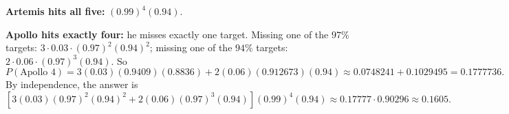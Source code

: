 \textbf{Artemis hits all five:} $(0.99)^4(0.94)$.

\textbf{Apollo hits exactly four:} he misses exactly one target. Missing one of the $97\%$ targets: $3\cdot0.03\cdot(0.97)^2(0.94)^2$; missing one of the $94\%$ targets: $2\cdot0.06\cdot(0.97)^3(0.94)$. So
\[P(\text{Apollo }4)=3(0.03)(0.9409)(0.8836)+2(0.06)(0.912673)(0.94)\approx0.0748241+0.1029495=0.1777736.\]
By independence, the answer is
\[\left[3(0.03)(0.97)^2(0.94)^2+2(0.06)(0.97)^3(0.94)\right](0.99)^4(0.94)\approx0.17777\cdot0.90296\approx\boxed{0.1605}.\]
